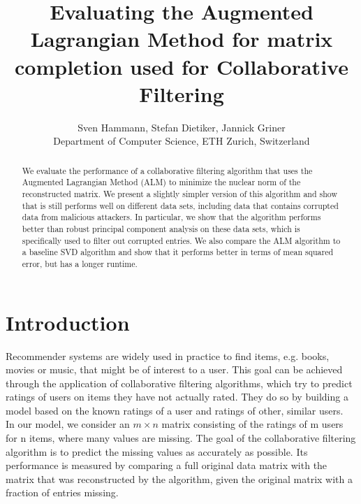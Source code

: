 \documentclass[10pt,conference,compsocconf]{IEEEtran}
\begin{document}
\title{Evaluating the Augmented Lagrangian Method for matrix completion used for Collaborative Filtering}

\author{
  Sven Hammann, Stefan Dietiker, Jannick Griner\\
  Department of Computer Science, ETH Zurich, Switzerland
}



\maketitle

\begin{abstract}
We evaluate the performance of a collaborative filtering algorithm that uses the
Augmented Lagrangian Method (ALM) to minimize the nuclear norm of the reconstructed matrix.
We present a slightly simpler version of this algorithm and show that is still performs
well on different data sets, including data that contains corrupted data from malicious attackers.
In particular, we show that the algorithm performs better than robust principal component analysis
on these data sets, which is specifically used to filter out corrupted entries. We also compare the
ALM algorithm to a baseline SVD algorithm and show that it performs better in terms of mean squared
error, but has a longer runtime.
\end{abstract}

\section{Introduction}
Recommender systems are widely used in practice to find items, e.g. books, movies or music,
that might be of interest to a user. This goal can be achieved through the application of collaborative filtering algorithms, which try to predict ratings of
users on items they have not actually rated. They do so by building a model based on the known ratings of a user and ratings of other, similar users. \\

In our model, we consider an $m \times n$ matrix consisting of the ratings of m users for n items,
where many values are missing. The goal of the collaborative filtering
algorithm is to predict the missing values as accurately as possible. Its performance is measured
by comparing a full original data matrix with the matrix that was reconstructed by the algorithm,
given the original matrix with a fraction of entries missing. \\
\end{document}

